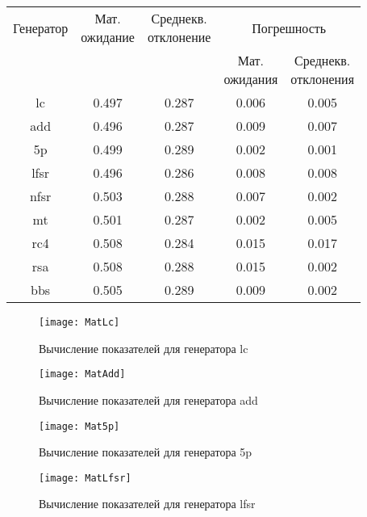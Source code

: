 \documentclass[bachelor, och, coursework]{shiza}
\begin{document}
	\begin{center}
		\begin{tabular}{|c|c|c|c|c|}
			\hline
			Генератор & \shortstack{ Мат. \\ ожидание} & \shortstack{Среднекв. \\ отклонение} & \multicolumn{2}{c|}{Погрешность}\\
			\cline{4-5}
			& & & \shortstack{Мат. \\ ожидания} & \shortstack{Среднекв. \\ отклонения}\\
			\hline
			lc & 0.497 & 0.287 & 0.006 & 0.005 \\
			\hline
			add & 0.496 & 0.287 & 0.009 & 0.007 \\
			\hline
			5p & 0.499 & 0.289 & 0.002 & 0.001 \\
			\hline
			lfsr & 0.496 & 0.286 & 0.008 & 0.008 \\
			\hline
			nfsr & 0.503 & 0.288 & 0.007 & 0.002 \\
			\hline
			mt & 0.501 & 0.287 & 0.002 & 0.005 \\
			\hline
			rc4 & 0.508 & 0.284 & 0.015 & 0.017 \\
			\hline
			rsa & 0.508 & 0.288 & 0.015 & 0.002 \\
			\hline
			bbs & 0.505 & 0.289 & 0.009 & 0.002 \\
			\hline
		\end{tabular}
	\end{center}
		
	\begin{figure}[H]
		\centering
		\texttt{[image: MatLc]}
		\caption{Вычисление показателей для генератора lc}
		\label{fig:MatLc}
	\end{figure}

	\begin{figure}[H]
		\centering
		\texttt{[image: MatAdd]}
		\caption{Вычисление показателей для генератора add}
		\label{fig:MatAdd}
	\end{figure}
	
	\begin{figure}[H]
		\centering
		\texttt{[image: Mat5p]}
		\caption{Вычисление показателей для генератора 5p}
		\label{fig:Mat5p}
	\end{figure}	
	
	\begin{figure}[H]
		\centering
		\texttt{[image: MatLfsr]}
		\caption{Вычисление показателей для генератора lfsr}
		\label{fig:MatLfsr}
	\end{figure}
	
\end{document}
